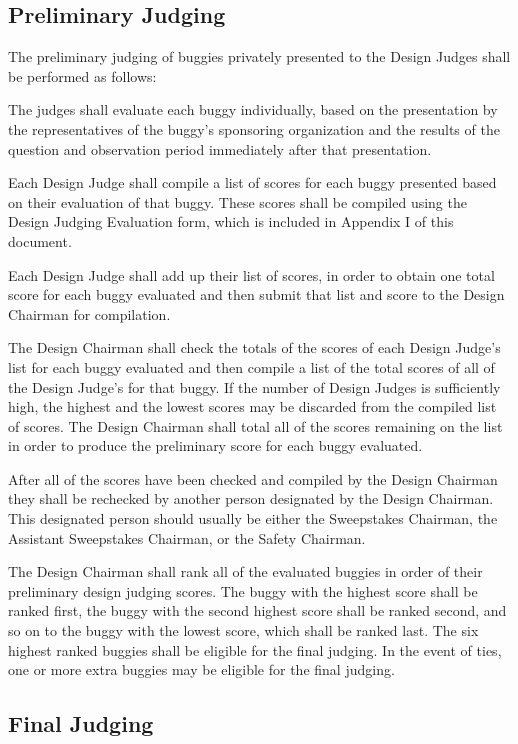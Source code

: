 \subsection{Preliminary Judging}

	The preliminary judging of buggies privately presented to the Design Judges shall be performed as follows:
	\newline

	The judges shall evaluate each buggy individually, based on the presentation by the representatives of the buggy's sponsoring organization and the results of the question and observation period immediately after that presentation.

	Each Design Judge shall compile a list of scores for each buggy presented based on their evaluation of that buggy. These scores shall be compiled using the Design Judging Evaluation form, which is included in Appendix I of this document.

	Each Design Judge shall add up their list of scores, in order to obtain one total score for each buggy evaluated and then submit that list and score to the Design Chairman for compilation.

	The Design Chairman shall check the totals of the scores of each Design Judge's list for each buggy evaluated and then compile a list of the total scores of all of the Design Judge's for that buggy. If the number of Design Judges is sufficiently high, the highest and the lowest scores may be discarded from the compiled list of scores. The Design Chairman shall total all of the scores remaining on the list in order to produce the preliminary score for each buggy evaluated.
	
	After all of the scores have been checked and compiled by the Design Chairman they shall be rechecked by another person designated by the Design Chairman. This designated person should usually be either the Sweepstakes Chairman, the Assistant Sweepstakes Chairman, or the Safety Chairman.

	The Design Chairman shall rank all of the evaluated buggies in order of their preliminary design judging scores. The buggy with the highest score shall be ranked first, the buggy with the second highest score shall be ranked second, and so on to the buggy with the lowest score, which shall be ranked last. The six highest ranked buggies shall be eligible for the final judging. In the event of ties, one or more extra buggies may be eligible for the final judging.

\subsection{Final Judging}

